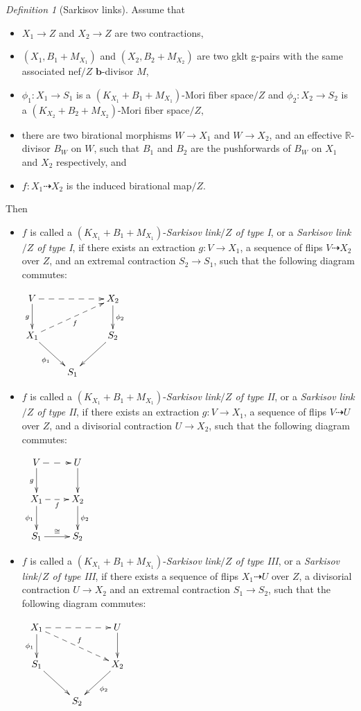\documentclass[11pt]{amsart}
\numberwithin{equation}{section}
\newcommand{\bb}{\bm{b}}
\newcommand{\Rr}{\mathbb{R}}
\theoremstyle{definition}
\theoremstyle{remark}
\newtheorem{defn}[thm]{Definition}
\theoremstyle{definition}
\begin{document}
\begin{defn}[Sarkisov links]
Assume that
\begin{itemize}
    \item $X_1\rightarrow Z$ and $X_2\rightarrow Z$ are two contractions,
    \item $(X_1,B_1+M_{X_1})$ and $(X_2,B_2+M_{X_2})$ are two gklt g-pairs with the same associated nef$/Z$ $\bb$-divisor $M$,
    \item $\phi_1: X_1\rightarrow S_1$ is a $(K_{X_1}+B_1+M_{X_1})$-Mori fiber space$/Z$ and $\phi_2: X_2\rightarrow S_2$ is a $(K_{X_2}+B_2+M_{X_2})$-Mori fiber space$/Z$, 
    \item there are two birational morphisms $W\rightarrow X_1$ and $W\rightarrow X_2$, and an effective $\Rr$-divisor $B_W$ on $W$, such that $B_1$ and $B_2$ are the pushforwards of $B_W$ on $X_1$ and $X_2$ respectively, and
    \item  $f: X_1\dashrightarrow X_2$ is the induced birational map$/Z$.
\end{itemize}
Then 
\begin{itemize}
    \item $f$ is called a $(K_{X_1}+B_1+M_{X_1})$-\emph{Sarkisov link$/Z$ of type I}, or a \emph{Sarkisov link$/Z$ of type I}, if there exists an extraction $g: V\rightarrow X_1$, a sequence of flips $V\dashrightarrow X_2$ over $Z$, and an extremal contraction $S_2\rightarrow S_1$, such that the following diagram commutes:
    \begin{center}$\xymatrix{
 V\ar@{->}[d]_{g}\ar@{-->}[rr]& &X_2\ar@{->}[d]^{\phi_2} \\
      X_1\ar@{-->}[rru]_{f}\ar@{->}[dr]_{\phi_1}   &  & S_2\ar@{->}[dl] \\
    & S_1 &}$
\end{center}
\item $f$ is called a $(K_{X_1}+B_1+M_{X_1})$-\emph{Sarkisov link$/Z$ of type II}, or a \emph{Sarkisov link$/Z$ of type II}, if there exists an extraction $g: V\rightarrow X_1$, a sequence of flips $V\dashrightarrow U$ over $Z$, and a divisorial contraction $U\rightarrow X_2$, such that the following diagram commutes:
\begin{center}$\xymatrix{
 V\ar@{->}[d]_{g}\ar@{-->}[r]& U\ar@{->}[d] \\
      X_1\ar@{-->}[r]_{f}\ar@{->}[d]_{\phi_1}    & X_2\ar@{->}[d]^{\phi_2} \\
    S_1\ar@{->}[r]^{\cong}& S_2 }$
\end{center}
\item $f$ is called a $(K_{X_1}+B_1+M_{X_1})$-\emph{Sarkisov link$/Z$ of type III}, or a \emph{Sarkisov link$/Z$ of type III}, if there exists a sequence of flips $X_1\dashrightarrow U$ over $Z$, a divisorial contraction $U\rightarrow X_2$ and an extremal contraction $S_1\rightarrow S_2$, such that the following diagram commutes:
\begin{center}$\xymatrix{
 X_1\ar@{->}[d]_{\phi_1}\ar@{-->}[drr]^{f}\ar@{-->}[rr]& &U\ar@{->}[d] \\
      S_1\ar@{->}[dr]   &  & X_2\ar@{->}[dl]^{\phi_2} \\
    & S_2 &}$
\end{center}


\end{itemize}
\end{defn}
\end{document}
